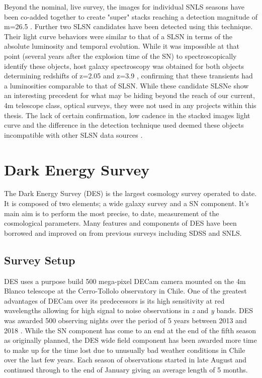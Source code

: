 Beyond the nominal, live survey, the images for individual SNLS seasons have been co-added together to create "super" stacks reaching a detection magnitude of m=26.5 \citep{Cooke2012}. Further two SLSN candidates have been detected using this technique. Their light curve behaviors were similar to that of a SLSN in terms of the absolute luminosity and temporal evolution. While it was impossible at that point (several years after the explosion time of the SN) to spectroscopically identify these objects, host galaxy spectroscopy was obtained for both objects determining redshifts of z=2.05 and z=3.9 \citep{Cooke2012}, confirming that these transients had a luminosities comparable to that of SLSN. While these candidate SLSNe show an interesting precedent for what may be hiding beyond the reach of our current, 4m telescope class, optical surveys, they were not used in any projects within this thesis. The lack of certain confirmation, low cadence in the stacked images light curve and the difference in the detection technique used deemed these objects incompatible with other SLSN data sources \citep{Prajs2016}.

\section{Dark Energy Survey}
The Dark Energy Survey (DES) is the largest cosmology survey operated to date. It is composed of two elements; a wide galaxy survey and a SN component. It's main aim is to perform the most precise, to date, measurement of the cosmological parameters. Many features and components of DES have been borrowed and improved on from previous surveys including SDSS and SNLS.

\subsection{Survey Setup}
DES uses a purpose build 500 mega-pixel DECam camera \citep{Honscheid2008,Flaugher2015} mounted on the 4m Blanco telescope at the Cerro-Tollolo observatory in Chile. One of the greatest advantages of DECam over its predecessors is its high sensitivity at red wavelengths allowing for high signal to noise observations in \textit{z} and \textit{y} bands. DES was awarded 500 observing nights over the period of 5 years between 2013 and 2018 \citep{DES2016}. While the SN component has come to an end at the end of the fifth season as originally planned, the DES wide field component has been awarded more time to make up for the time lost due to unusually bad weather conditions in Chile over the last few years. Each season of observations started in late August and continued through to the end of January giving an average length of 5 months.


